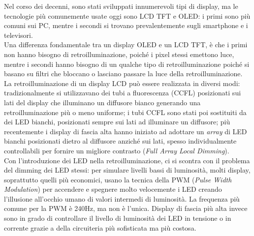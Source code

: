 Nel corso dei decenni, sono stati sviluppati innumerevoli tipi di display, ma le tecnologie più comunemente usate oggi sono LCD TFT e OLED: i primi sono più comuni sui PC, mentre i secondi si trovano prevalentemente sugli smartphone e i televisori.\\
Una differenza fondamentale tra un display OLED e un LCD TFT, è che i primi non hanno bisogno di retroilluminazione, poiché i pixel stessi emettono luce, mentre i secondi hanno bisogno di un qualche tipo di retroilluminazione poiché si basano su filtri che bloccano o lasciano passare la luce della retroilluminazione.\\
La retroilluminazione di un display LCD può essere realizzata in diversi modi: tradizionalmente si utilizzavano dei tubi a fluorescenza (CCFL) posizionati sui lati del display che illuminano un diffusore bianco generando una retroilluminazione più o meno uniforme; i tubi CCFL sono stati poi sostituiti da dei LED bianchi, posizionati sempre sui lati ad illuminare un diffusore; più recentemente i display di fascia alta hanno iniziato ad adottare un \textit{array} di LED bianchi posizionati dietro al diffusore anziché sui lati, spesso individualmente controllabili per fornire un migliore contrasto (\textit{Full Array Local Dimming}\cite{localdimming}).\\
Con l'introduzione dei LED nella retroilluminazione, ci si scontra con il problema del dimming dei LED stessi: per simulare livelli bassi di luminosità, molti display, soprattutto quelli più economici, usano la tecnica della PWM (\textit{Pulse Width Modulation}\cite{pwm_backlight}) per accendere e spegnere molto velocemente i LED creando l'illusione all'occhio umano di valori intermedi di luminosità. La frequenza più comune per la PWM è 240Hz, ma non è l'unica. Display di fascia più alta invece sono in grado di controllare il livello di luminosità dei LED in tensione o in corrente grazie a della circuiteria più sofisticata ma più costosa.

